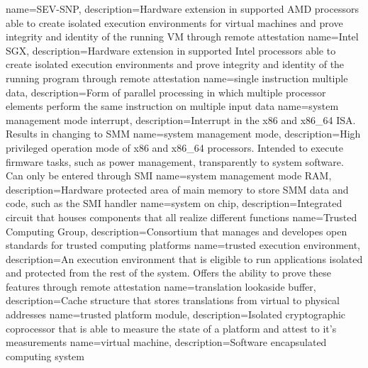 %
{
    name=SEV-SNP,
    description={Hardware extension in supported AMD processors able to create isolated execution environments for
            virtual machines and prove integrity and identity of the running VM through remote attestation}
}
{
    name=Intel SGX,
    description={Hardware extension in supported Intel processors able to create isolated execution environments and
            prove integrity and identity of the running program through remote attestation}
}
{
    name={single instruction multiple data},
    description={Form of parallel processing in which multiple processor elements perform the same instruction on
            multiple input data}
}
{
    name=system management mode interrupt,
    description={Interrupt in the x86 and x86\_64 ISA. Results in changing to SMM}
}
{
    name=system management mode,
    description={High privileged operation mode of x86 and x86\_64 processors. Intended to execute firmware tasks, such
            as power management, transparently to system software. Can only be entered through SMI}
}
{
    name=system management mode RAM,
    description={Hardware protected area of main memory to store SMM data and code, such as the
            SMI handler}
}
{
    name=system on chip,
    description={Integrated circuit that houses components that all realize different functions}
}
%
{
    name=Trusted Computing Group,
    description={Consortium that manages and developes open standards for trusted computing platforms}
}
{
    name=trusted execution environment,
    description={An execution environment that is eligible to run applications isolated and protected from the rest of
            the system. Offers the ability to prove these features through remote attestation}
}
{
    name=translation lookaside buffer,
    description={Cache structure that stores translations from virtual to physical addresses}
}
{
    name=trusted platform module,
    description={Isolated cryptographic coprocessor that is able to measure the state of a platform and attest to it's measurements}
}
%
{
    name=virtual machine,
    description={Software encapsulated computing system}
}

